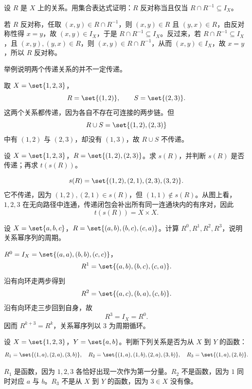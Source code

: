 \begin{exercise}[level=advanced]
设 $R$ 是 $X$ 上的关系。用集合表达式证明：$R$ 反对称当且仅当 $R\cap R^{-1}\subseteq I_X$。
\begin{solution}
若 $R$ 反对称，任取 $(x,y)\in R\cap R^{-1}$，则 $(x,y)\in R$ 且 $(y,x)\in R$，由反对称性得 $x=y$，故 $(x,y)\in I_X$，于是 $R\cap R^{-1}\subseteq I_X$。反过来，若 $R\cap R^{-1}\subseteq I_X$，且 $(x,y),(y,x)\in R$，则 $(x,y)\in R\cap R^{-1}$，从而 $(x,y)\in I_X$，故 $x=y$，所以 $R$ 反对称。
\end{solution}
\end{exercise}

\begin{exercise}[level=advanced]
举例说明两个传递关系的并不一定传递。
\begin{solution}
取 $X=\set{1,2,3}$，
  \[
  R=\set{(1,2)},\qquad S=\set{(2,3)}.
  \]
  这两个关系都传递，因为各自不存在可连接的两步链。但
  \[
  R\cup S=\set{(1,2),(2,3)}
  \]
  中有 $(1,2)$ 与 $(2,3)$，却没有 $(1,3)$，故 $R\cup S$ 不传递。
\end{solution}
\end{exercise}

\begin{exercise}[level=advanced]
设 $X=\set{1,2,3}$，$R=\set{(1,2),(2,3)}$。求 $s(R)$，并判断 $s(R)$ 是否传递；再求 $t(s(R))$。
\begin{solution}
\[
  s(R)=\set{(1,2),(2,1),(2,3),(3,2)}.
  \]
  它不传递，因为 $(1,2),(2,1)\in s(R)$，但 $(1,1)\notin s(R)$。从图上看，$1,2,3$ 在无向路径中连通，传递闭包会补出所有同一连通块内的有序对，因此
  \[
  t(s(R))=X\times X.
  \]
\end{solution}
\end{exercise}

\begin{exercise}[level=advanced]
设 $X=\set{a,b,c}$，$R=\set{(a,b),(b,c),(c,a)}$。计算 $R^0,R^1,R^2,R^3$，说明关系幂序列的周期。
\begin{solution}
$R^0=I_X=\set{(a,a),(b,b),(c,c)}$，
  \[
  R^1=\set{(a,b),(b,c),(c,a)}.
  \]
  沿有向环走两步得到
  \[
  R^2=\set{(a,c),(b,a),(c,b)}.
  \]
  沿有向环走三步回到自身，故
  \[
  R^3=I_X=R^0.
  \]
  因而 $R^{k+3}=R^k$，关系幂序列以 $3$ 为周期循环。
\end{solution}
\end{exercise}

\begin{exercise}[level=advanced]
设 $X=\set{1,2,3}$，$Y=\set{a,b}$。判断下列关系是否为从 $X$ 到 $Y$ 的函数：
  \[
  R_1=\set{(1,a),(2,a),(3,b)},\quad
  R_2=\set{(1,a),(1,b),(2,a),(3,b)},\quad
  R_3=\set{(1,a),(2,b)}.
  \]
\begin{solution}
$R_1$ 是函数，因为 $1,2,3$ 各恰好出现一次作为第一分量。$R_2$ 不是函数，因为 $1$ 同时对应 $a$ 与 $b$。$R_3$ 不是从 $X$ 到 $Y$ 的函数，因为 $3\in X$ 没有像。
\end{solution}
\end{exercise}


